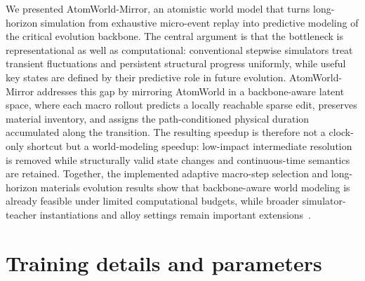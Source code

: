 \documentclass{article}
\begin{document}
We presented AtomWorld-Mirror, an atomistic world model that turns long-horizon simulation from exhaustive micro-event replay into predictive modeling of the critical evolution backbone. The central argument is that the bottleneck is representational as well as computational: conventional stepwise simulators treat transient fluctuations and persistent structural progress uniformly, while useful key states are defined by their predictive role in future evolution. AtomWorld-Mirror addresses this gap by mirroring AtomWorld in a backbone-aware latent space, where each macro rollout predicts a locally reachable sparse edit, preserves material inventory, and assigns the path-conditioned physical duration accumulated along the transition. The resulting speedup is therefore not a clock-only shortcut but a world-modeling speedup: low-impact intermediate resolution is removed while structurally valid state changes and continuous-time semantics are retained. Together, the implemented adaptive macro-step selection and long-horizon materials evolution results show that backbone-aware world modeling is already feasible under limited computational budgets, while broader simulator-teacher instantiations and alloy settings remain important extensions~\cite{jain2013materialsproject,merchant2023gnome,karniadakis2021piml}.

\newpage
{\small


}

\newpage
\appendix

\section{Training details and parameters}
\label{app:training-details}
\end{document}
